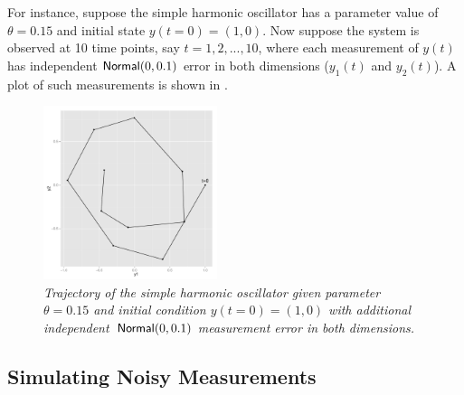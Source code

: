 For instance, suppose the simple harmonic oscillator has a parameter
value of $\theta = 0.15$ and initial state $y(t=0) = (1,0)$.  Now
suppose the system is observed at 10 time points, say $t=1, 2, ...,
10$, where each measurement of $y(t)$ has independent
$\distro{Normal}(0, 0.1)$ error in both dimensions ($y_1(t)$ and
$y_2(t)$).  A plot of such measurements is shown in
.
%
\begin{figure}
\begin{center}
\includegraphics[height=2in]{img/sho-ode-trajectory.pdf}%
\end{center}
\vspace*{-0.25in}
\caption{\small\it Trajectory of the simple harmonic oscillator given
  parameter $\theta=0.15$ and initial condition $y(t=0) = (1,0)$ with
  additional independent\ $\distro{Normal}(0,0.1)$ measurement error
  in both dimensions.}%
\label{sho-trajectory.figure}
\end{figure}



\subsection{Simulating Noisy Measurements}

